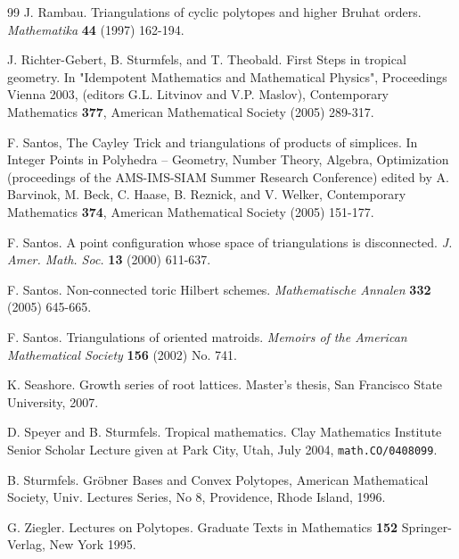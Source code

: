 \documentclass[11pt]{amsart}
\begin{document}
\begin{thebibliography}{99}
J. Rambau. Triangulations of cyclic polytopes and higher Bruhat orders. \emph{Mathematika} {\bf  44} (1997) 162-194.


J. Richter-Gebert, B. Sturmfels, and T. Theobald. First Steps in tropical geometry. In "Idempotent Mathematics and Mathematical Physics", Proceedings Vienna 2003, (editors G.L. Litvinov and V.P. Maslov), Contemporary Mathematics {\bf 377}, American Mathematical Society (2005) 289-317.


F. Santos, The Cayley Trick and triangulations of products of simplices. 
In Integer Points in Polyhedra -- Geometry, Number Theory, Algebra, Optimization (proceedings of the AMS-IMS-SIAM Summer Research Conference) edited by A. Barvinok, M. Beck, C. Haase, B. Reznick, and V. Welker, Contemporary Mathematics {\bf 374}, American Mathematical Society (2005) 151-177.


F. Santos. A point configuration whose space of triangulations is
disconnected. \emph{J. Amer. Math. Soc.} {\bf 13} (2000) 611-637.

F. Santos. Non-connected toric Hilbert schemes.
\emph{Mathematische Annalen} {\bf 332} (2005) 645-665.

F. Santos. Triangulations of oriented matroids. \emph{Memoirs of the American Mathematical Society} {\bf 156} (2002) No. 741.

K. Seashore. Growth series of root lattices. Master's thesis, San Francisco State University, 2007.

D. Speyer and B. Sturmfels. Tropical mathematics. Clay Mathematics Institute Senior Scholar Lecture given at Park City, Utah, July 2004, \texttt{math.CO/0408099}.

B. Sturmfels. Gr\"obner Bases and Convex Polytopes, American Mathematical Society, Univ. Lectures Series, No 8, Providence, Rhode Island, 1996. 

G. Ziegler. Lectures on Polytopes. Graduate Texts in Mathematics {\bf 152} Springer-Verlag, New York 1995.

\end{thebibliography}
\end{document}
